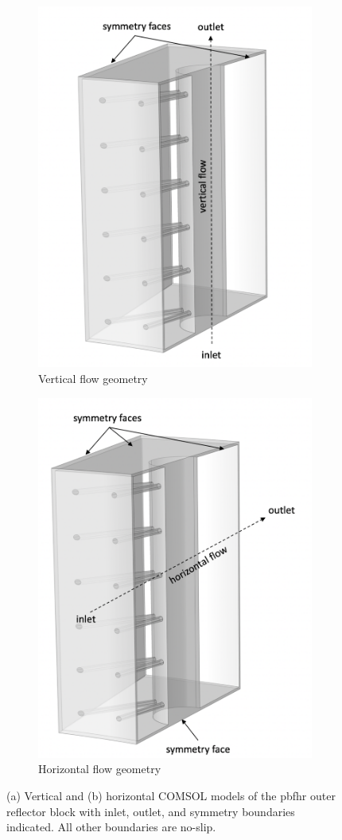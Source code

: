 \begin{figure}[!htb]
\centering
\begin{subfigure}{.49\textwidth}
  \centering
  \includegraphics[width=0.7\linewidth]{figs/vertical.png}
  \caption{Vertical flow geometry}
  \label{fig:vertical}
\end{subfigure}
\begin{subfigure}{.49\textwidth}
  \centering
  \includegraphics[width=0.7\linewidth]{figs/horizontal.png}
  \caption{Horizontal flow geometry}
  \label{fig:horizontal}
\end{subfigure}
\caption{(a) Vertical and (b) horizontal COMSOL models of the \gls{pbfhr} outer reflector block with inlet, outlet, and symmetry boundaries indicated. All other boundaries are no-slip.}
\label{fig:blocks}
\end{figure}


